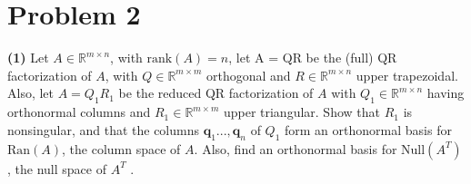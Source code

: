 \documentclass[a4paper,11pt]{article}
\newcommand{\R}{\mathbb{R}}
\begin{document}
\section*{Problem 2}
\textbf{(1)} Let $A \in \R^{m\times n}$, with $\text{rank}(A) = n$, let {A = QR} be the (full) QR factorization of $A$, with $Q \in \R^{m\times m} $ orthogonal and $R \in \R^{m\times n}$ upper trapezoidal. Also, let $A = Q_1 R_1$ be the reduced QR factorization of $A$ with $Q_1 \in \R^{m\times n}$ having orthonormal columns and $R_1 \in \R^{m\times m}$ upper triangular. Show that $R_1$ is nonsingular, and that the columns $\textbf{q}_1 . . . , \textbf{q}_n$ of $Q_1$ form an orthonormal basis for $\text{Ran}(A)$, the column space of $A$. Also, find an orthonormal basis for $\text{Null}(A^T)$, the null space of $A^T$ .\\
\end{document}
